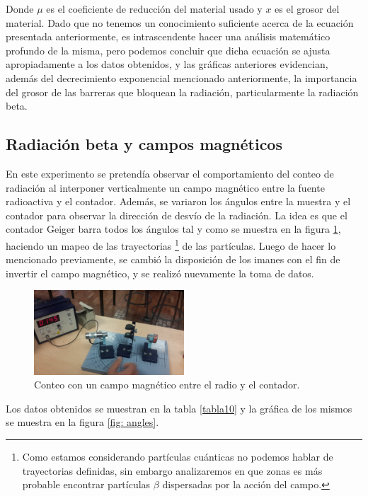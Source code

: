 \documentclass[prb,aps,twocolumn,preprintnumbers,amsmath,amssymb]{revtex4}
\begin{document}
Donde $\mu$ es el coeficiente de reducción del material usado y $x$ es el grosor del material. Dado que no tenemos un conocimiento suficiente acerca de la ecuación presentada anteriormente, es intrascendente hacer una análisis matemático profundo de la misma, pero podemos concluir que dicha ecuación se ajusta apropiadamente a los datos obtenidos, y las gráficas anteriores evidencian, además del decrecimiento exponencial  mencionado anteriormente, la importancia del grosor de las barreras que bloquean la radiación, particularmente la radiación beta.

\subsection{Radiación beta y campos magnéticos}

En este experimento se pretendía observar el comportamiento del conteo de radiación al interponer verticalmente un campo magnético entre la fuente radioactiva y el contador. Además, se variaron los ángulos entre la muestra y el contador para observar la dirección de desvío de la radiación. La idea es que el contador Geiger barra todos los ángulos tal y como se muestra en la figura \ref{fig: montaje2}, haciendo un mapeo de las trayectorias \footnote{Como estamos considerando partículas cuánticas no podemos hablar de trayectorias definidas, sin embargo analizaremos en que zonas es más probable encontrar partículas $\beta$ dispersadas por la acción del campo.} de las partículas. Luego de hacer lo mencionado previamente, se cambió la disposición de los imanes con el fin de invertir el campo magnético, y se realizó nuevamente la toma de datos.\\

\begin{figure}[h!]
	\centering
	\includegraphics[width=0.5\textwidth]{montaje2}
	\caption{Conteo con un campo magnético entre el radio y el contador.}
	\label{fig: montaje2}
\end{figure}

Los datos obtenidos se muestran en la tabla \ref{tabla10} y la gráfica de los mismos se muestra en la figura \ref{fig: angles}.\\
\end{document}
